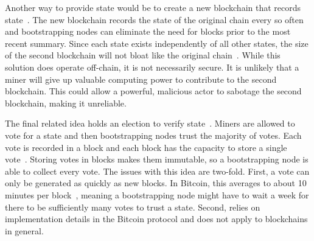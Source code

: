 
Another way to provide state would be to create a new blockchain that records state~\cite{marsalek2019BockSummariesSeparateChain}.
The new blockchain records the state of the original chain every so often and bootstrapping nodes can eliminate the need for blocks prior to the most recent summary.
Since each state exists independently of all other states, the size of the second blockchain will not bloat like the original chain~\cite{marsalek2019BockSummariesSeparateChain}.
While this solution does operate off-chain, it is not necessarily secure.
It is unlikely that a miner will give up valuable computing power to contribute to the second blockchain.
This could allow a powerful, malicious actor to sabotage the second blockchain, making it unreliable.


The final related idea holds an election to verify state~\cite{matzutt2020HowTSPrune}.
Miners are allowed to vote for a state and then bootstrapping nodes trust the majority of votes.
Each vote is recorded in a block and each block has the capacity to store a single vote~\cite{matzutt2020HowTSPrune}.
Storing votes in blocks makes them immutable, so a bootstrapping node is able to collect every vote.
The issues with this idea are two-fold.
First, a vote can only be generated as quickly as new blocks.
In Bitcoin, this averages to about 10 minutes per block~\cite{nakamoto2009Bitcoin}, meaning a bootstrapping node might have to wait a week for there to be sufficiently many votes to trust a state.
Second, \cite{matzutt2020HowTSPrune} relies on implementation details in the Bitcoin protocol and does not apply to blockchains in general.
